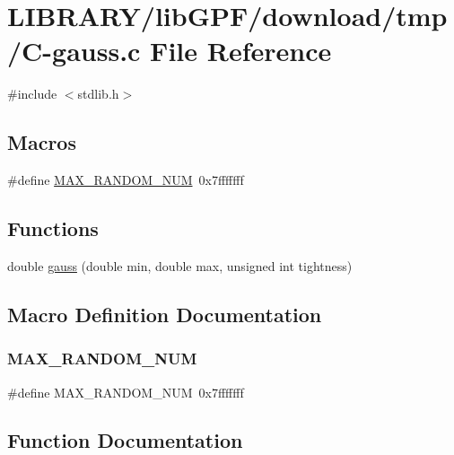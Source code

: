 \hypertarget{C-gauss_8c}{}\section{L\+I\+B\+R\+A\+R\+Y/lib\+G\+P\+F/download/tmp/\+C-\/gauss.c File Reference}
\label{C-gauss_8c}
{\ttfamily \#include $<$stdlib.\+h$>$}\newline
\subsection*{Macros}
\begin{DoxyCompactItemize}
\item 
\#define \hyperlink{C-gauss_8c_a64407a0bc863a5b26b13d92cc62a70a2}{M\+A\+X\+\_\+\+R\+A\+N\+D\+O\+M\+\_\+\+N\+UM}~0x7fffffff
\end{DoxyCompactItemize}
\subsection*{Functions}
\begin{DoxyCompactItemize}
\item 
double \hyperlink{C-gauss_8c_accc1ca68e89030f8370eaa5093381e70}{gauss} (double min, double max, unsigned int tightness)
\end{DoxyCompactItemize}


\subsection{Macro Definition Documentation}
\mbox{\label{C-gauss_8c_a64407a0bc863a5b26b13d92cc62a70a2}} 
\subsubsection{\texorpdfstring{M\+A\+X\+\_\+\+R\+A\+N\+D\+O\+M\+\_\+\+N\+UM}{MAX\_RANDOM\_NUM}}
{\footnotesize\ttfamily \#define M\+A\+X\+\_\+\+R\+A\+N\+D\+O\+M\+\_\+\+N\+UM~0x7fffffff}



\subsection{Function Documentation}
\mbox{\label{C-gauss_8c_accc1ca68e89030f8370eaa5093381e70}} 
